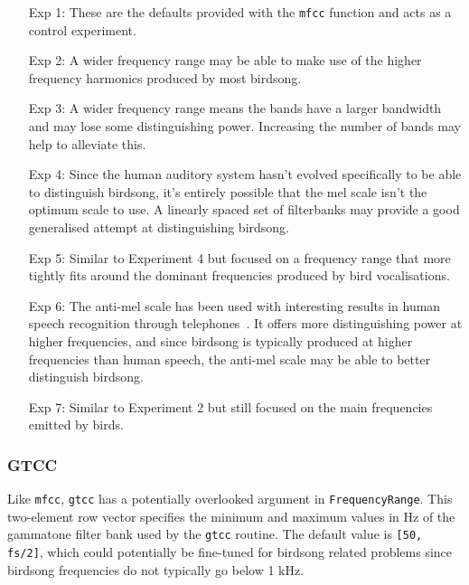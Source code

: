 \begin{itemize}

  \item [Exp 1:] These are the defaults provided with the \texttt{mfcc}
    function and acts as a control experiment.

  \item [Exp 2:] A wider frequency range may be able to make use of the
    higher frequency harmonics produced by most birdsong.

  \item [Exp 3:] A wider frequency range means the bands have a larger bandwidth
    and may lose some distinguishing power. Increasing the number of bands may
    help to alleviate this.

  \item [Exp 4:] Since the human auditory system hasn't evolved specifically to be
    able to distinguish birdsong, it's entirely possible that the mel scale
    isn't the optimum scale to use. A linearly spaced set of filterbanks may
    provide a good generalised attempt at distinguishing birdsong.

  \item [Exp 5:] Similar to Experiment 4 but focused on a frequency range that
    more tightly fits around the dominant frequencies produced by bird
    vocalisations.

  \item [Exp 6:] The anti-mel scale has been used with interesting results in
    human speech recognition through telephones~\cite{lei2009mel}. It offers
    more distinguishing power at higher frequencies, and since birdsong is
    typically produced at higher frequencies than human speech, the anti-mel
    scale may be able to better distinguish birdsong.

  \item [Exp 7:] Similar to Experiment 2 but still focused on the main
    frequencies emitted by birds.

\end{itemize}

\subsubsection{GTCC}\label{sssec:gtcc}

Like \texttt{mfcc}, \texttt{gtcc} has a potentially overlooked argument in
\texttt{FrequencyRange}. This two-element row vector specifies the minimum and
maximum values in Hz of the gammatone filter bank used by the \texttt{gtcc}
routine. The default value is \texttt{[50, fs/2]}, which could potentially be
fine-tuned for birdsong related problems since birdsong frequencies do not
typically go below 1 kHz.

